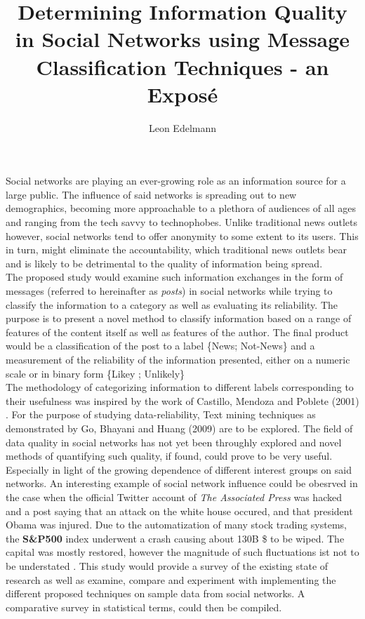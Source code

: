 \documentclass[12pt]{article}
\begin{document}
\title{Determining Information Quality \\ in Social Networks using Message \\ Classification Techniques - an Expos\'e}
\author{Leon Edelmann}

\maketitle
\section*{}
Social networks are playing an ever-growing role as an information source for a large public. The influence of said networks is spreading out to new demographics, becoming more approachable to a plethora of audiences of all ages and ranging from the tech savvy to technophobes. Unlike traditional news outlets however, social networks tend to offer anonymity to some extent to its users. This in turn, might eliminate the accountability, which traditional news outlets bear and is likely to be detrimental to the quality of information being spread.
\\

The proposed study would examine such information exchanges in the form of messages (referred to hereinafter as \textit{posts}) in social networks while trying to classify the information to a category as well as evaluating its reliability. The purpose is to present a novel method to classify information based on a range of features of the content itself as well as  features of the author. The final product would be a classification of the post to a label  \{News; Not-News\} and a measurement of the reliability of the information presented, either on a numeric scale or in binary form \{Likey ; Unlikely\}
\\

The methodology of categorizing information to different labels corresponding to their usefulness was inspired by the work of Castillo, Mendoza and Poblete (2001)
\cite{castillo}. For the purpose of studying data-reliability, Text mining techniques as demonstrated by Go, Bhayani and Huang (2009)\cite{go} are to be explored. The field of data quality in social networks has not yet been throughly explored and novel methods of quantifying such quality, if found, could prove to be very useful. Especially in light of the growing dependence of different interest groups on said networks. An interesting example of social network influence could be obesrved in the case when the official Twitter account of \textit{ The Associated Press} was hacked and a post saying that an attack on the white house occured, and that president Obama was injured. Due to the automatization of many stock trading systems, the \textbf{ S\&P500} index underwent a crash causing about 130B \$ to be wiped. The capital was mostly restored, however the magnitude of such fluctuations ist not to be understated \cite{hack}. This study would provide a survey of the existing state of research as well as examine, compare and experiment with implementing the different proposed techniques on sample data from social networks. A comparative survey in statistical terms, could then be compiled.
\\
\newpage
\end{document}

